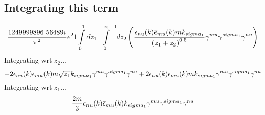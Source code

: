 \subsection*{Integrating this term}
\begin{dmath}\frac{1249999896.56489 i}{\pi^{2}} e^{2}1\int\limits_{ 0 }^{ 1 } d{ z_{ 1 } }\int\limits_{ 0 }^{ - { z_{ 1 } } + 1 } d{ z_{ 2 } }\left(\frac{\epsilon_{ \\nu }({ k }) \bar{\epsilon}_{ \\mu }({ k }) m { { k }_{ \\sigma_1 } }}{\left({ z_{ 1 } } + { z_{ 2 } }\right)^{0.5}} { \gamma^{ \\mu } } { \gamma^{ \\sigma_1 } } { \gamma^{ \\nu } }\right)\end{dmath}
Integrating wrt ${ z_{ 2 } }$...
\begin{dmath}- 2 \epsilon_{ \\nu }({ k }) \bar{\epsilon}_{ \\mu }({ k }) m \sqrt{{ z_{ 1 } }} { { k }_{ \\sigma_1 } } { \gamma^{ \\mu } } { \gamma^{ \\sigma_1 } } { \gamma^{ \\nu } } + 2 \epsilon_{ \\nu }({ k }) \bar{\epsilon}_{ \\mu }({ k }) m { { k }_{ \\sigma_1 } } { \gamma^{ \\mu } } { \gamma^{ \\sigma_1 } } { \gamma^{ \\nu } }\end{dmath}
Integrating wrt ${ z_{ 1 } }$...
\begin{dmath}\frac{2 m}{3} \epsilon_{ \\nu }({ k }) \bar{\epsilon}_{ \\mu }({ k }) { { k }_{ \\sigma_1 } } { \gamma^{ \\mu } } { \gamma^{ \\sigma_1 } } { \gamma^{ \\nu } }\end{dmath}
